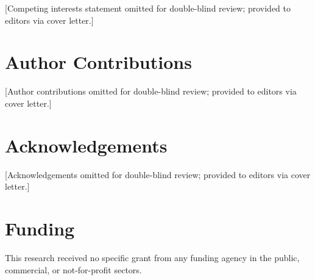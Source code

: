 \documentclass[11pt]{article}
\begin{document}
[Competing interests statement omitted for double-blind review;
provided to editors via cover letter.]


\section*{Author Contributions}

[Author contributions omitted for double-blind review;
provided to editors via cover letter.]


\section*{Acknowledgements}

[Acknowledgements omitted for double-blind review;
provided to editors via cover letter.]


\section*{Funding}

This research received no specific grant from any funding agency in the
public, commercial, or not-for-profit sectors.


\end{document}
